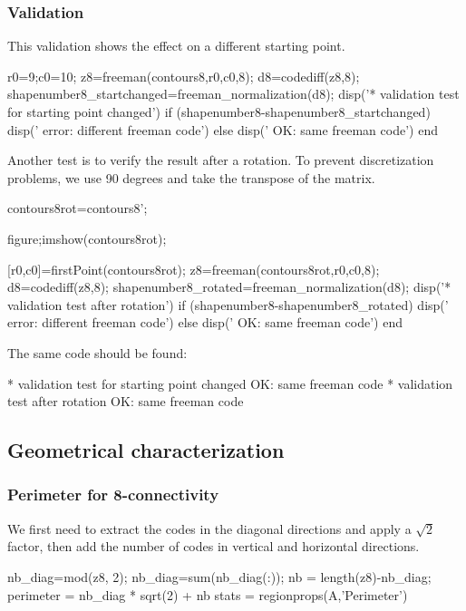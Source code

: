 \subsubsection{Validation}
This validation shows the effect on a different starting point.

\begin{matlab}
r0=9;c0=10;
z8=freeman(contours8,r0,c0,8);
d8=codediff(z8,8);
shapenumber8_startchanged=freeman_normalization(d8);
disp('* validation test for starting point changed')
if (shapenumber8-shapenumber8_startchanged)
    disp('   error: different freeman code')
else
    disp('   OK: same freeman code')
end
\end{matlab}

Another test is to verify the result after a rotation. To prevent discretization problems, we use 90 degrees and take the transpose of the matrix.

\begin{matlab}
contours8rot=contours8';

figure;imshow(contours8rot);

[r0,c0]=firstPoint(contours8rot);
z8=freeman(contours8rot,r0,c0,8);
d8=codediff(z8,8);
shapenumber8_rotated=freeman_normalization(d8);
disp('* validation test after rotation')
if (shapenumber8-shapenumber8_rotated)
    disp('   error: different freeman code')
else
    disp('   OK: same freeman code')
end
\end{matlab}

The same code should be found:
\begin{mwindow}
* validation test for starting point changed
   OK: same freeman code
* validation test after rotation
   OK: same freeman code
\end{mwindow}


\subsection{Geometrical characterization}
\subsubsection{Perimeter for 8-connectivity}
We first need to extract the codes in the diagonal directions and apply a $\sqrt{2}$ factor, then add the number of codes in vertical and horizontal directions.

\begin{matlab}
nb_diag=mod(z8, 2);
nb_diag=sum(nb_diag(:));
nb = length(z8)-nb_diag;
perimeter = nb_diag * sqrt(2) + nb
stats = regionprops(A,'Perimeter')
\end{matlab}

